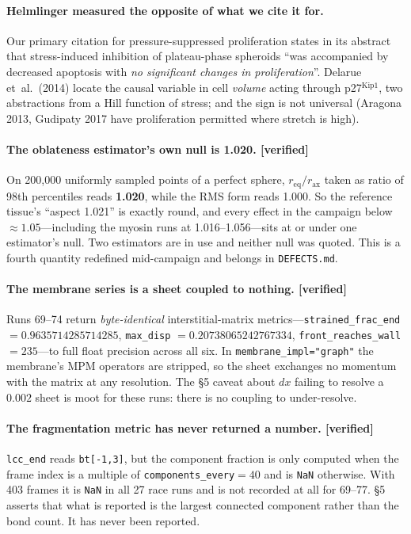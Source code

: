 \documentclass[10pt]{article}
\begin{document}
\paragraph{Helmlinger measured the opposite of what we cite it for.} Our primary citation for
pressure-suppressed proliferation states in its abstract that stress-induced inhibition of plateau-phase
spheroids ``was accompanied by decreased apoptosis with \emph{no significant changes in
proliferation}''. Delarue et~al.\ (2014) locate the causal variable in cell \emph{volume} acting through
p27$^{\text{Kip1}}$, two abstractions from a Hill function of stress; and the sign is not universal
(Aragona 2013, Gudipaty 2017 have proliferation permitted where stretch is high).

\paragraph{The oblateness estimator's own null is 1.020. [verified]} On 200{,}000 uniformly sampled
points of a perfect sphere, $r_{\text{eq}}/r_{\text{ax}}$ taken as ratio of 98th percentiles reads
\textbf{1.020}, while the RMS form reads 1.000. So the reference tissue's ``aspect 1.021'' is exactly
round, and every effect in the campaign below $\approx\!1.05$---including the myosin runs at
1.016--1.056---sits at or under one estimator's null. Two estimators are in use and neither null was
quoted. This is a fourth quantity redefined mid-campaign and belongs in \texttt{DEFECTS.md}.

\paragraph{The membrane series is a sheet coupled to nothing. [verified]} Runs 69--74 return
\emph{byte-identical} interstitial-matrix metrics---\texttt{strained\_frac\_end} $=0.9635714285714285$,
\texttt{max\_disp} $=0.20738065242767334$, \texttt{front\_reaches\_wall} $=235$---to full float precision
across all six. In \texttt{membrane\_impl="graph"} the membrane's MPM operators are stripped, so the
sheet exchanges no momentum with the matrix at any resolution. The \S5 caveat about $dx$ failing to
resolve a $0.002$ sheet is moot for these runs: there is no coupling to under-resolve.

\paragraph{The fragmentation metric has never returned a number. [verified]} \texttt{lcc\_end} reads
\texttt{bt[-1,3]}, but the component fraction is only computed when the frame index is a multiple of
\texttt{components\_every}$=40$ and is \texttt{NaN} otherwise. With 403 frames it is \texttt{NaN} in all
27 race runs and is not recorded at all for 69--77. \S5 asserts that what is reported is the largest
connected component rather than the bond count. It has never been reported.
\end{document}

